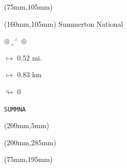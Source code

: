 \begin{textblock*}{80mm}(75mm,105mm)%
\end{textblock*}
\begin{textblock*}{40mm}(160mm,105mm)%
Summerton National
\par $\circledcirc\llcorner^{\rightthreetimes}\circledcirc$
\Large
\par$\mapsto$ 0.52 mi.
\par$\mapsto$ 0.83 km
\par$\looparrowright$ 0
\par\hfill\tiny\tt SUMMNA\\
\end{textblock*}
\begin{textblock*}{20mm}(200mm,5mm)%
\fbox{\thepage}
\end{textblock*}
\begin{textblock*}{20mm}(200mm,285mm)%
\fbox{\thepage}
\end{textblock*}
\begin{textblock*}{80mm}(75mm,195mm)%
\end{textblock*}
